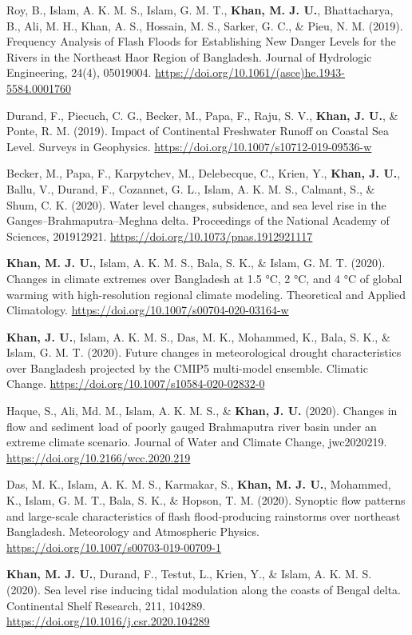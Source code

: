 \documentclass[11pt,a4paper,sans]{moderncv}
\begin{document}
\begin{hangparas}{1cm}{1}
Roy, B., Islam, A. K. M. S., Islam, G. M. T., \textbf{Khan, M. J. U.}, Bhattacharya, B., Ali, M. H., Khan, A. S., Hossain, M. S., Sarker, G. C., \& Pieu, N. M. (2019). Frequency Analysis of Flash Floods for Establishing New Danger Levels for the Rivers in the Northeast Haor Region of Bangladesh. Journal of Hydrologic Engineering, 24(4), 05019004. \url{https://doi.org/10.1061/(asce)he.1943-5584.0001760}

Durand, F., Piecuch, C. G., Becker, M., Papa, F., Raju, S. V., \textbf{Khan, J. U.}, \& Ponte, R. M. (2019). Impact of Continental Freshwater Runoff on Coastal Sea Level. Surveys in Geophysics. \url{https://doi.org/10.1007/s10712-019-09536-w} 

Becker, M., Papa, F., Karpytchev, M., Delebecque, C., Krien, Y., \textbf{Khan, J. U.}, Ballu, V., Durand, F., Cozannet, G. L., Islam, A. K. M. S., Calmant, S., \& Shum, C. K. (2020). Water level changes, subsidence, and sea level rise in the Ganges–Brahmaputra–Meghna delta. Proceedings of the National Academy of Sciences, 201912921. \url{https://doi.org/10.1073/pnas.1912921117} 

\textbf{Khan, M. J. U.}, Islam, A. K. M. S., Bala, S. K., \& Islam, G. M. T. (2020). Changes in climate extremes over Bangladesh at 1.5 °C, 2 °C, and 4 °C of global warming with high-resolution regional climate modeling. Theoretical and Applied Climatology. \url{https://doi.org/10.1007/s00704-020-03164-w} 

\textbf{Khan, J. U.}, Islam, A. K. M. S., Das, M. K., Mohammed, K., Bala, S. K., \& Islam, G. M. T. (2020). Future changes in meteorological drought characteristics over Bangladesh projected by the CMIP5 multi-model ensemble. Climatic Change. \url{https://doi.org/10.1007/s10584-020-02832-0} 

Haque, S., Ali, Md. M., Islam, A. K. M. S., \& \textbf{Khan, J. U.} (2020). Changes in flow and sediment load of poorly gauged Brahmaputra river basin under an extreme climate scenario. Journal of Water and Climate Change, jwc2020219. \url{https://doi.org/10.2166/wcc.2020.219} 

Das, M. K., Islam, A. K. M. S., Karmakar, S., \textbf{Khan, M. J. U.}, Mohammed, K., Islam, G. M. T., Bala, S. K., \& Hopson, T. M. (2020). Synoptic flow patterns and large-scale characteristics of flash flood-producing rainstorms over northeast Bangladesh. Meteorology and Atmospheric Physics. \url{https://doi.org/10.1007/s00703-019-00709-1}

\textbf{Khan, M. J. U.}, Durand, F., Testut, L., Krien, Y., \& Islam, A. K. M. S. (2020). Sea level rise inducing tidal modulation along the coasts of Bengal delta. Continental Shelf Research, 211, 104289. \url{https://doi.org/10.1016/j.csr.2020.104289}
\end{hangparas}
\end{document}
